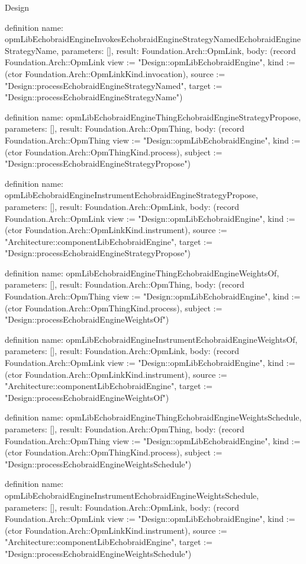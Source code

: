 \begin{lexlean}{Design}
\begin{semanticmodule}
definition{
  name: opmLibEchobraidEngineInvokesEchobraidEngineStrategyNamedEchobraidEngineStrategyName,
  parameters: [],
  result: Foundation.Arch::OpmLink,
  body: (record Foundation.Arch::OpmLink {view := "Design::opmLibEchobraidEngine", kind := (ctor Foundation.Arch::OpmLinkKind.invocation), source := "Design::processEchobraidEngineStrategyNamed", target := "Design::processEchobraidEngineStrategyName"})
}

definition{
  name: opmLibEchobraidEngineThingEchobraidEngineStrategyPropose,
  parameters: [],
  result: Foundation.Arch::OpmThing,
  body: (record Foundation.Arch::OpmThing {view := "Design::opmLibEchobraidEngine", kind := (ctor Foundation.Arch::OpmThingKind.process), subject := "Design::processEchobraidEngineStrategyPropose"})
}

definition{
  name: opmLibEchobraidEngineInstrumentEchobraidEngineStrategyPropose,
  parameters: [],
  result: Foundation.Arch::OpmLink,
  body: (record Foundation.Arch::OpmLink {view := "Design::opmLibEchobraidEngine", kind := (ctor Foundation.Arch::OpmLinkKind.instrument), source := "Architecture::componentLibEchobraidEngine", target := "Design::processEchobraidEngineStrategyPropose"})
}

definition{
  name: opmLibEchobraidEngineThingEchobraidEngineWeightsOf,
  parameters: [],
  result: Foundation.Arch::OpmThing,
  body: (record Foundation.Arch::OpmThing {view := "Design::opmLibEchobraidEngine", kind := (ctor Foundation.Arch::OpmThingKind.process), subject := "Design::processEchobraidEngineWeightsOf"})
}

definition{
  name: opmLibEchobraidEngineInstrumentEchobraidEngineWeightsOf,
  parameters: [],
  result: Foundation.Arch::OpmLink,
  body: (record Foundation.Arch::OpmLink {view := "Design::opmLibEchobraidEngine", kind := (ctor Foundation.Arch::OpmLinkKind.instrument), source := "Architecture::componentLibEchobraidEngine", target := "Design::processEchobraidEngineWeightsOf"})
}

definition{
  name: opmLibEchobraidEngineThingEchobraidEngineWeightsSchedule,
  parameters: [],
  result: Foundation.Arch::OpmThing,
  body: (record Foundation.Arch::OpmThing {view := "Design::opmLibEchobraidEngine", kind := (ctor Foundation.Arch::OpmThingKind.process), subject := "Design::processEchobraidEngineWeightsSchedule"})
}

definition{
  name: opmLibEchobraidEngineInstrumentEchobraidEngineWeightsSchedule,
  parameters: [],
  result: Foundation.Arch::OpmLink,
  body: (record Foundation.Arch::OpmLink {view := "Design::opmLibEchobraidEngine", kind := (ctor Foundation.Arch::OpmLinkKind.instrument), source := "Architecture::componentLibEchobraidEngine", target := "Design::processEchobraidEngineWeightsSchedule"})
}


\end{semanticmodule}
\end{lexlean}
